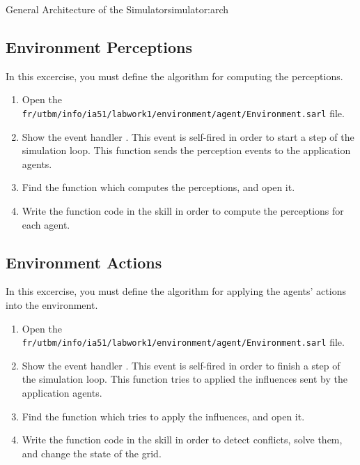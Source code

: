 \documentclass[article,english,nodocumentinfo]{multiagentfrreport}
\begin{document}
\begin{mfigures}{General Architecture of the Simulator}{simulator:arch}
	\hspace{1cm}
\end{mfigures}

\subsection{Environment Perceptions}

In this excercise, you must define the algorithm for computing the perceptions.
\begin{enumerate}
\item Open the \texttt{fr/utbm/info/ia51/labwork1/environment/agent/Environment.sarl} file.
\item Show the event handler . This event is self-fired in order to start a step of the simulation loop. This function sends the perception events to the application agents.
\item Find the function which computes the perceptions, and open it.
\item Write the function code in the skill in order to compute the perceptions for each agent.
\end{enumerate}

\subsection{Environment Actions}

In this excercise, you must define the algorithm for applying the agents' actions into the environment.
\begin{enumerate}
\item Open the \texttt{fr/utbm/info/ia51/labwork1/environment/agent/Environment.sarl} file.
\item Show the event handler . This event is self-fired in order to finish a step of the simulation loop. This function tries to applied the influences sent by the application agents.
\item Find the function which tries to apply the influences, and open it.
\item Write the function code in the skill in order to detect conflicts, solve them, and change the state of the grid.
\end{enumerate}
\end{document}

